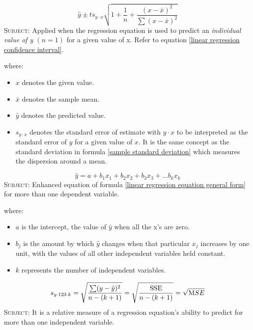 \begin{equation}
\label{linear regression prediction interval}
\hat{y} \pm t s_{y \cdotp x}\sqrt{1+\frac{1}{n}+\frac{(x-\bar{x})^2}{\sum(x-\bar{x})^2}}
\end{equation}
\textsc{Subject:} Applied when the regression equation is used to predict an \emph{individual value of y $(n = 1)$} for a given value of x. Refer to equation \eqref{linear regression confidence interval}.

where:
\begin{itemize}
 \item $x$ denotes the given value.
 \item $\bar{x}$ denotes the sample mean.
 \item $\hat{y}$ denotes the predicted value. 
 \item $s_{y \cdotp x}$ denotes the standard error of estimate with $y \cdotp x$ to be interpreted as the standard error of $y$ for a given value of $x$. It is the same concept as the standard deviation in formula \eqref{sample standard deviation} which measures the dispersion around a mean.
\end{itemize}
\hformbar


\begin{equation}
\label{multiple regression general equation}
\hat{y} = a + b_{1}x_{1} + b_{2}x_{2} + b_{3}x_{3} + ... b_{k}x_{k}
\end{equation}
\textsc{Subject:} Enhanced equation of formula \eqref{linear regression equation general form} for more than one dependent variable.

where:
\begin{itemize}
 \item $a$ is the intercept, the value of $\hat{y}$ when all the x's are zero.
 \item $b_{j}$ is the amount by which $\hat{y}$ changes when that particular $x_{j}$ increases by one unit, with the values of all other independent variables held constant.
 \item $k$ represents the number of independent variables.
\end{itemize}
\hformbar


\begin{equation}
\label{multiple regression standard error of estimate}
s_{y \cdotp 123 \cdotp k} = \sqrt{\frac{\sum(y-\hat{y})^2}{n-(k+1)}} = \sqrt{\frac{\text{SSE}}{n-(k+1)}} = \sqrt{\text MSE}
\end{equation}
\textsc{Subject:} It is a relative measure of a regression equation's ability to predict for more than one independent variable.

